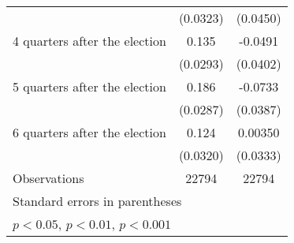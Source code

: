 \begin{table}[htbp]
\begin{tabular}{l*{2}{c}}
                    &    (0.0323)         &    (0.0450)         \\
[1em]
 4 quarters after the election&       0.135\sym{***}&     -0.0491         \\
                    &    (0.0293)         &    (0.0402)         \\
[1em]
 5 quarters after the election&       0.186\sym{***}&     -0.0733         \\
                    &    (0.0287)         &    (0.0387)         \\
[1em]
 6 quarters after the election&       0.124\sym{***}&     0.00350         \\
                    &    (0.0320)         &    (0.0333)         \\
\hline
Observations        &       22794         &       22794         \\
\hline\hline
\multicolumn{3}{l}{\footnotesize Standard errors in parentheses}\\
\multicolumn{3}{l}{\footnotesize \sym{*} \(p<0.05\), \sym{**} \(p<0.01\), \sym{***} \(p<0.001\)}\\
\end{tabular}
\end{table}

